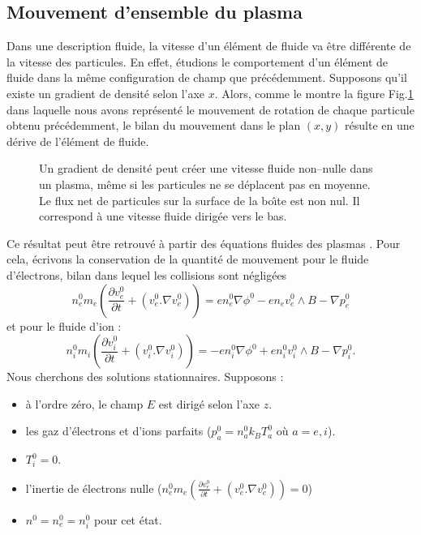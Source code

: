 \documentclass{book}
\begin{document}
\subsection{Mouvement d'ensemble du plasma}
Dans une description fluide, la vitesse
d'un \'el\'ement de fluide 
va \^etre diff\'erente de la vitesse des particules.
En effet, \'etudions le comportement d'un \'el\'ement de fluide
dans la m\^eme configuration de champ que pr\'ec\'edemment.
Supposons qu'il existe un gradient de densit\'e selon l'axe $x$.
Alors, comme le montre la figure Fig.\ref{diadrift} dans
laquelle nous avons repr\'esent\'e le mouvement de rotation
de chaque particule obtenu pr\'ec\'edemment, le bilan
du mouvement dans le plan $(x,y)$ r\'esulte en une d\'erive de
l'\'el\'ement de fluide. 
\begin{figure}[htb]
 \centerline{}   
 \caption{Un gradient de densit\'e peut cr\'eer une vitesse fluide
non--nulle dans un plasma, m\^eme si les particules ne se d\'eplacent
pas en moyenne. Le flux net de particules sur la surface de la bo\^\i te
est non nul. Il correspond \`a une vitesse fluide dirig\'ee vers le
bas.}
 \label{diadrift}
\end{figure}
%
Ce r\'esultat peut \^etre retrouv\'e \`a partir des \'equations fluides
des plasmas \cite{Braginskii65}.
Pour cela, \'ecrivons la 
conservation 
de la quantit\'e de mouvement
pour le fluide 
d'\'electrons, bilan dans lequel les collisions sont
n\'eglig\'ees 
\begin{equation}\label{me}
n^0_e m_e(\frac{\partial v^0_e}{\partial t}+({v}^0_e.\nabla
v^0_e))=en^0_e\nabla \phi^0 - e n_e v_e^0 \wedge B -\nabla p_e^0
\end{equation}
et pour le fluide d'ion :
\begin{equation}\label{mi}
n_i^0 m_i(\frac{\partial v^0_i}{\partial t}+({v}^0_i.\nabla v^0_i))=-en^0_i\nabla \phi^0 + en_i^0 v^0_i \wedge B -\nabla p^0_i.
\end{equation}
Nous cherchons des solutions stationnaires.
Supposons : 
\begin{itemize}
\item \`a l'ordre z\'ero, le champ $E$ est dirig\'e selon
l'axe $z$.
\item les gaz d'\'electrons et d'ions 
parfaits ($p^0_a=n_a^0k_BT^0_a$
o\`u $a=e,i$).
\item $T^0_i=0$.
\item l'inertie de \'electrons nulle ($n^0_e m_e(\frac{\partial v^0_e}{\partial t}+({v}^0_e.\nabla v^0_e))=0$)
\item $n^0=n^0_e=n^0_i$ pour cet \'etat.
\end{itemize}
\end{document}
